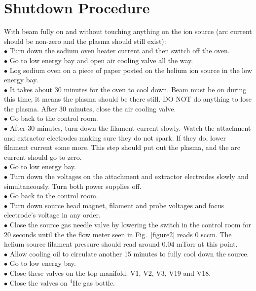 \documentclass{article}
\begin{document}
\section{Shutdown Procedure}

With beam fully on and without touching anything on the ion source (arc current should be non-zero and the plasma should still exist):\\
$\bullet$ Turn down the sodium oven heater current and then switch off the oven.\\
$\bullet$ Go to low energy bay and open air cooling valve all the way.\\
$\bullet$ Log sodium oven on a piece of paper posted on the helium ion source in the low energy bay.\\
$\bullet$ It takes about 30 minutes for the oven to cool down. Beam must be on during this time, it means the plasma should be there still. DO NOT do anything to lose the plasma. After 30 minutes, close the air cooling valve.\\
$\bullet$ Go back to the control room.\\
$\bullet$ After 30 minutes, turn down the filament current slowly. Watch the attachment and extractor electrodes making sure they do not spark. If they do, lower filament current some more. This step should put out the plasma, and the arc current should go to zero.\\
$\bullet$ Go to low energy bay.\\
$\bullet$ Turn down the voltages on the attachment and extractor electrodes slowly and simultaneously. Turn both power supplies off.\\
$\bullet$ Go back to the control room.\\
$\bullet$ Turn down source head magnet, filament and probe voltages and focus electrode's voltage in any order.\\
$\bullet$ Close the source gas needle valve by lowering the switch in the control room for 20 seconds until the the flow meter seen in Fig.~\ref{figure2} reads 0 sccm. The helium source filament pressure should read around 0.04 mTorr at this point.\\
$\bullet$ Allow cooling oil to circulate another 15 minutes to fully cool down the source.\\
$\bullet$ Go to low energy bay.\\
$\bullet$ Close these valves on the top manifold: V1, V2, V3, V19 and V18.\\
$\bullet$ Close the valves on $^{4}$He gas bottle.\\
\end{document}

